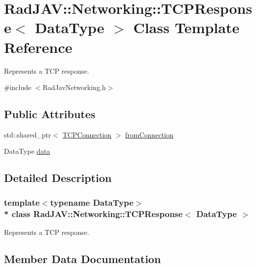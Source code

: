 \hypertarget{class_rad_j_a_v_1_1_networking_1_1_t_c_p_response}{}\section{Rad\+J\+AV\+:\+:Networking\+:\+:T\+C\+P\+Response$<$ Data\+Type $>$ Class Template Reference}
\label{class_rad_j_a_v_1_1_networking_1_1_t_c_p_response}


Represents a T\+CP response.  




{\ttfamily \#include $<$Rad\+Jav\+Networking.\+h$>$}

\subsection*{Public Attributes}
\begin{DoxyCompactItemize}
\item 
std\+::shared\+\_\+ptr$<$ \hyperlink{class_rad_j_a_v_1_1_networking_1_1_t_c_p_connection}{T\+C\+P\+Connection} $>$ \hyperlink{class_rad_j_a_v_1_1_networking_1_1_t_c_p_response_a256974dab7fab1800d974135d8aa1f47}{from\+Connection}
\item 
Data\+Type \hyperlink{class_rad_j_a_v_1_1_networking_1_1_t_c_p_response_ae5bd39a2e169a0f19e16614c6f76de8d}{data}
\end{DoxyCompactItemize}


\subsection{Detailed Description}
\subsubsection*{template$<$typename Data\+Type$>$\\*
class Rad\+J\+A\+V\+::\+Networking\+::\+T\+C\+P\+Response$<$ Data\+Type $>$}

Represents a T\+CP response. 

\subsection{Member Data Documentation}
